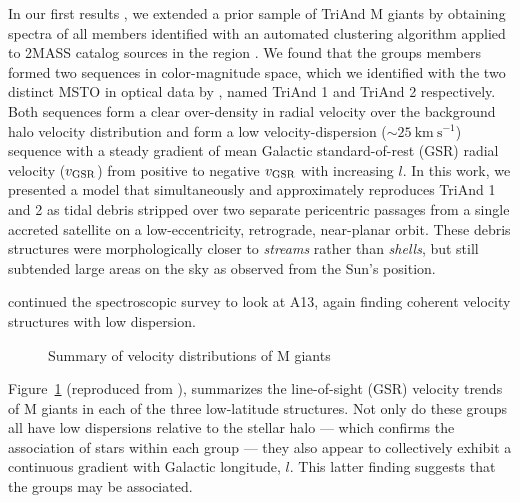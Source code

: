 \documentclass[galaxies,article,submit,moreauthors,pdftex,10pt,a4paper]{mdpi}
\newcommand{\kms}{\mathrm{km}~\mathrm{s}^{-1}}
\begin{document}
In our first results \citep{sheffield14}, we extended a prior sample of TriAnd
M giants \citep{rochapinto04} by obtaining spectra of all members identified
with an automated clustering algorithm applied to 2MASS catalog sources in the
region \citep{sharma10}.
We found that the groups members formed two sequences in color-magnitude space, which we identified with the two distinct MSTO in optical data by \cite{martin07}, named TriAnd 1 and TriAnd 2 respectively.
Both sequences form a clear over-density in radial velocity over the background halo velocity distribution and form a low velocity-dispersion ($\sim 25~\kms$) sequence with a steady gradient of mean Galactic standard-of-rest (GSR) radial velocity ($v_{\rm GSR}$) from positive to negative $v_{\rm GSR}$ with increasing $l$.
In this work, we presented a model that simultaneously and approximately reproduces TriAnd 1 and 2 as tidal debris stripped over two separate pericentric passages from a single accreted satellite on a low-eccentricity, retrograde, near-planar orbit.
These debris structures were morphologically closer to {\it streams} rather
than {\it shells}, but still subtended large areas on the sky as observed from
the Sun's position.

\cite{li17} continued the spectroscopic survey to look at A13, again finding coherent velocity structures with low dispersion.

\begin{figure}[t]
\centering
\caption{\label{fig:ting_vel}
Summary of velocity distributions of M giants}
\end{figure}


Figure~\ref{fig:ting_vel} (reproduced from \citealt{li17}), summarizes the line-of-sight (GSR) velocity trends of M giants in each of the three low-latitude structures.
Not only do these groups all have low dispersions relative to the stellar halo
--- which confirms the association of stars within each group --- they also
appear to collectively exhibit a continuous gradient with Galactic longitude,
$l$.
This latter finding suggests that the groups may be associated.

\end{document}
